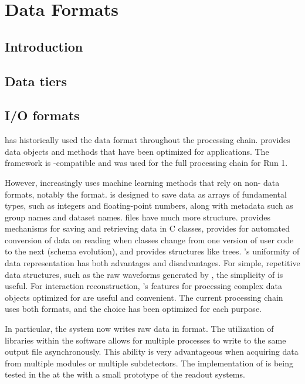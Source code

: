 \documentclass[../main-v1.tex]{subfiles}
\begin{document}
\chapter{Data Formats}
\label{ch:format}

\section{Introduction } 

\section{Data tiers }

\section{I/O formats }
 has historically used the  data format throughout the processing chain.   provides data objects and methods that have been optimized for  applications.  The  framework is -compatible and  was used for the full processing chain for  Run 1. 

However,  increasingly uses   machine learning methods that rely on non- data formats, notably the  format.   is designed to save data as arrays of fundamental types, such as integers and floating-point numbers, along with metadata such as group names and dataset names.   files have much more structure.   provides mechanisms for saving and retrieving data in C\raisebox{1pt}{++} classes, provides for automated conversion of data on reading when classes change from one version of user code to the next (schema evolution), and provides structures like trees. 's uniformity of data representation has both advantages and disadvantages. For simple, repetitive data structures, such as the raw waveforms generated by , the simplicity of  is useful.  For interaction reconstruction, 's features for processing complex data objects optimized for  are useful and convenient.  The current  processing chain uses both formats, and the choice has been optimized for each purpose.

In particular, the   system now writes raw data in  format. The utilization of  libraries within the  software allows for multiple processes to write to the same output file asynchronously. This ability is very advantageous when acquiring data from multiple  modules or multiple  subdetectors. The implementation of  is being tested %
in the  \coldbox at the  with a small prototype of the %
  readout systems. 
\end{document}
